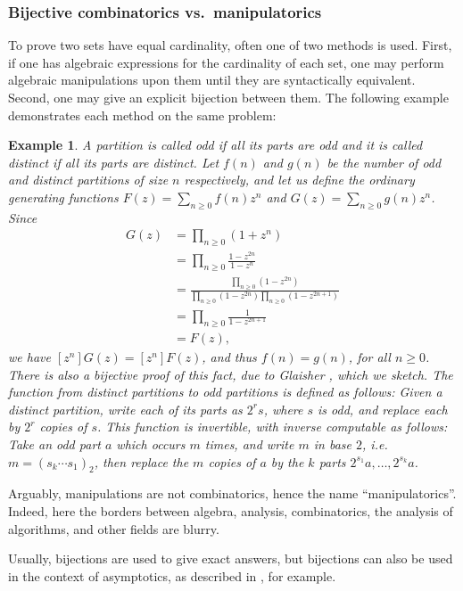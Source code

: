\documentclass[12pt]{article}
\theoremstyle{plain}
\newtheorem{exa}{Example}
\begin{document}
\subsubsection{Bijective combinatorics vs.\ manipulatorics}
To prove two sets have equal cardinality, often one of two methods is used.
First, if one has algebraic expressions for the cardinality of each set, one may perform algebraic
manipulations upon them until they are syntactically equivalent.
Second, one may give an explicit bijection between them.
The following example demonstrates each method on the same problem:

\begin{exa}
A partition is called \emph{odd} if all its parts are odd and it is called \emph{distinct} if all its parts are distinct.  Let \(f(n)\) and \( g(n) \)
be the number of odd and distinct partitions of size \( n \) respectively, and let us define the ordinary generating functions \( F(z) = \sum_{n \geq 0} f(n) z^n \)
and \( G(z) = \sum_{n \geq0} g(n) z^n \).  Since
\begin{align*}
G(z) &= \prod_{n \geq 0 } (1 + z^n) \\
&= \prod_{n \geq 0} \frac{1-z^{2n}}{1-z^n} \\
&= \frac{\prod_{n \geq 0} (1-z^{2n}) }{ \prod_{ n \geq 0 } (1-z^{2n}) \prod_{n \geq 0} (1-z^{2n + 1})} \\
&= \prod_{n \geq 0} \frac{1}{1-z^{2n+1}} \\
&= F(z),
\end{align*}
we have \([z^n]G(z) = [z^n]F(z) \), and thus \( f(n) = g(n) \), for all \( n \geq 0 \).
There is also a bijective proof of this fact, due to Glaisher \cite{companion}, which we sketch.
The function from distinct partitions to odd partitions is defined as follows: Given a distinct partition, write each of its parts as \(2^r s\), where \( s \) is odd, and replace each by \(2^r\) copies of \(s\).
This function is invertible, with inverse computable as follows: Take an odd part \( a \) which occurs \( m \) times, and write
\( m \) in base \(2\), i.e.{} \(m = (s_k \cdots s_1)_2 \),
then replace the \( m \) copies of \( a \) by the
\( k \) parts \(2^{s_1}a, \dots, 2^{s_k}a \).
\end{exa}

Arguably, manipulations are not combinatorics, hence the name ``manipulatorics''.
Indeed,  here the borders between algebra, analysis, combinatorics, the analysis of algorithms, and other fields  are blurry.

Usually, bijections are used to give exact answers, but bijections can also be used in the context of asymptotics, as described in \cite{ab}, for example.\\
\end{document}
